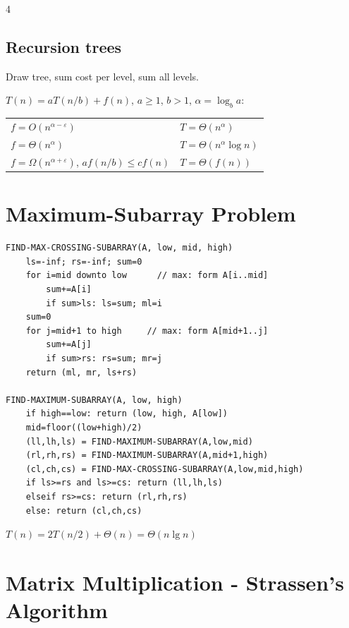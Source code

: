 \documentclass[8pt,a4paper,landscape]{extarticle}
\begin{document}
\begin{multicols*}{4}
\subsection{Recursion trees}
Draw tree, sum cost per level, sum all levels.

\begin{thm}[title=Master Theorem]
$T(n)=aT(n/b)+f(n)$, $a\ge1$, $b>1$, $\alpha=\log_b a$:\\[2pt]
\begin{tabular}{@{}l@{$\;\Rightarrow\;$}l@{}}
$f=O(n^{\alpha-\varepsilon})$                        & $T=\Theta(n^\alpha)$ \\
$f=\Theta(n^{\alpha})$                               & $T=\Theta(n^\alpha\log n)$ \\
$f=\Omega(n^{\alpha+\varepsilon})$, $af(n/b)\le cf(n)$ & $T=\Theta(f(n))$ \\
\end{tabular}
\end{thm}

\section{Maximum-Subarray Problem}

\begin{lstlisting}
FIND-MAX-CROSSING-SUBARRAY(A, low, mid, high)
    ls=-inf; rs=-inf; sum=0
    for i=mid downto low      // max: form A[i..mid]
        sum+=A[i]
        if sum>ls: ls=sum; ml=i
    sum=0
    for j=mid+1 to high     // max: form A[mid+1..j]
        sum+=A[j]
        if sum>rs: rs=sum; mr=j
    return (ml, mr, ls+rs)

FIND-MAXIMUM-SUBARRAY(A, low, high)
    if high==low: return (low, high, A[low])
    mid=floor((low+high)/2)
    (ll,lh,ls) = FIND-MAXIMUM-SUBARRAY(A,low,mid)
    (rl,rh,rs) = FIND-MAXIMUM-SUBARRAY(A,mid+1,high)
    (cl,ch,cs) = FIND-MAX-CROSSING-SUBARRAY(A,low,mid,high)
    if ls>=rs and ls>=cs: return (ll,lh,ls)
    elseif rs>=cs: return (rl,rh,rs)
    else: return (cl,ch,cs)
\end{lstlisting}

\begin{prop}[title=Runtime]
$T(n)=2T(n/2)+\Theta(n)=\Theta(n\lg n)$
\end{prop}

\section{Matrix Multiplication - Strassen's Algorithm}


\end{multicols*}
\end{document}
